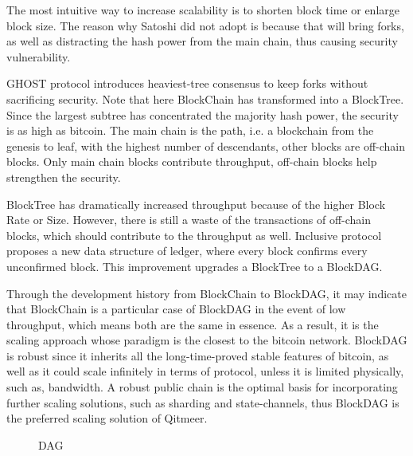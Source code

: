 \documentclass[a4paper,11pt]{article}
\begin{document}
The most intuitive way to increase scalability is to shorten block time or enlarge block size. The reason why Satoshi did not adopt is because that will bring forks, as well as distracting the hash power from the main chain, thus causing security vulnerability.

GHOST protocol introduces heaviest-tree consensus to keep forks without sacrificing security. Note that here BlockChain has transformed into a BlockTree. Since the largest subtree has concentrated the majority hash power, the security is as high as bitcoin. The main chain is the path, i.e. a blockchain from the genesis to leaf, with the highest number of descendants, other blocks are off-chain blocks. Only main chain blocks contribute throughput, off-chain blocks help strengthen the security. 

BlockTree has dramatically increased throughput because of the higher Block Rate or Size. However, there is still a waste of the transactions of off-chain blocks, which should contribute to the throughput as well. Inclusive\cite{Inclusive} protocol proposes a new data structure of ledger, where every block confirms every unconfirmed block. This improvement upgrades a BlockTree to a BlockDAG.

Through the development history from BlockChain to BlockDAG, it may indicate  that BlockChain is a particular case of BlockDAG in the event of low throughput, which means both are the same in essence. As a result,  it is the scaling approach whose paradigm is the closest to the bitcoin network. BlockDAG is robust since it inherits all the long-time-proved stable features of bitcoin,  as well as it could scale infinitely in terms of protocol, unless it is limited physically, such as, bandwidth. A robust public chain is the optimal basis for incorporating further scaling solutions, such as sharding and state-channels, thus BlockDAG is the preferred scaling solution of Qitmeer.


\begin{figure}[hbt]
	\centerline{%
	}
\caption{DAG}
\end{figure}
\end{document}
